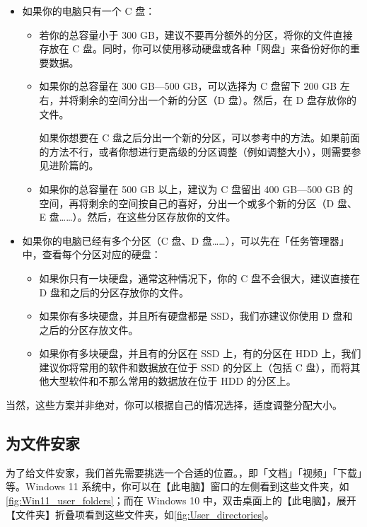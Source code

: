 {{{{\begin{itemize}
  \item 如果你的电脑只有一个 C 盘：
  \begin{itemize}
    \item 若你的总容量小于 300 GB，建议不要再分额外的分区，将你的文件直接存放在 C 盘。同时，你可以使用移动硬盘或各种「网盘」来备份好你的重要数据。
    \item 如果你的总容量在 300 GB—500 GB，可以选择为 C 盘留下 200 GB 左右，并将剩余的空间分出一个新的分区（D 盘）。然后，在 D 盘存放你的文件。
      \begin{note}
        如果你想要在 C 盘之后分出一个新的分区，可以参考中的方法。如果前面的方法不行，或者你想进行更高级的分区调整（例如调整大小），则需要参见进阶篇的。
      \end{note}
    \item 如果你的总容量在 500 GB 以上，建议为 C 盘留出 400 GB—500 GB 的空间，再将剩余的空间按自己的喜好，分出一个或多个新的分区（D 盘、E 盘……）。然后，在这些分区存放你的文件。
  \end{itemize}
  \item 如果你的电脑已经有多个分区（C 盘、D 盘……），可以先在「任务管理器」中，查看每个分区对应的硬盘：
  \begin{itemize}
    \item 如果你只有一块硬盘，通常这种情况下，你的 C 盘不会很大，建议直接在 D 盘和之后的分区存放你的文件。
    \item 如果你有多块硬盘，并且所有硬盘都是 SSD，我们亦建议你使用 D 盘和之后的分区存放文件。
    \item 如果你有多块硬盘，并且有的分区在 SSD 上，有的分区在 HDD 上，我们建议你将常用的软件和数据放在位于 SSD 的分区上（包括 C 盘），而将其他大型软件和不那么常用的数据放在位于 HDD 的分区上。
  \end{itemize}
\end{itemize}

当然，这些方案并非绝对，你可以根据自己的情况选择，适度调整分配大小。

\subsection{为文件安家}

为了给文件安家，我们首先需要挑选一个合适的位置。，即「文档」「视频」「下载」等。Windows 11 系统中，你可以在【此电脑】窗口的左侧看到这些文件夹，如\autoref{fig:Win11_user_folders}；而在 Windows 10 中，双击桌面上的【此电脑】，展开【文件夹】折叠项看到这些文件夹，如\autoref{fig:User_directories}。

}}}}
